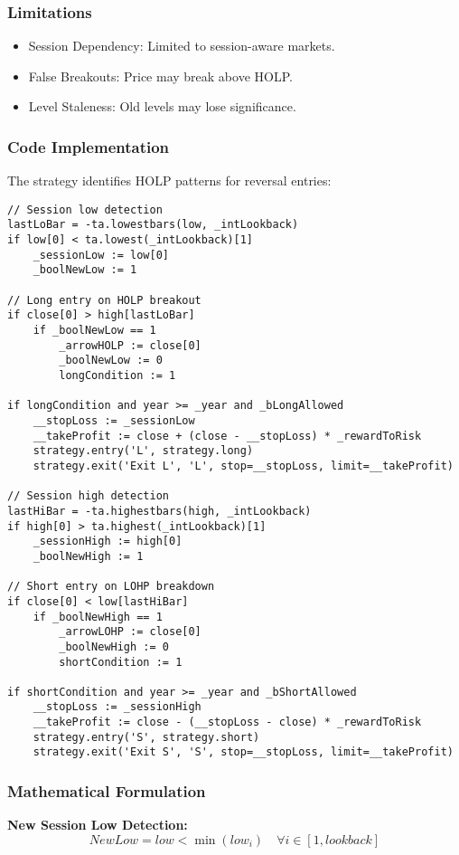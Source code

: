 \documentclass[12pt]{article}
\begin{document}
\subsubsection{Limitations}
\begin{itemize}
\item Session Dependency: Limited to session-aware markets.
\item False Breakouts: Price may break above HOLP.
\item Level Staleness: Old levels may lose significance.
\end{itemize}

\subsubsection{Code Implementation}
The strategy identifies HOLP patterns for reversal entries:

\begin{lstlisting}[language=Pine, caption=Pine Script Code for STRG-HOLP]
// Session low detection
lastLoBar = -ta.lowestbars(low, _intLookback)
if low[0] < ta.lowest(_intLookback)[1]
    _sessionLow := low[0]
    _boolNewLow := 1

// Long entry on HOLP breakout
if close[0] > high[lastLoBar]
    if _boolNewLow == 1
        _arrowHOLP := close[0]
        _boolNewLow := 0
        longCondition := 1

if longCondition and year >= _year and _bLongAllowed
    __stopLoss := _sessionLow
    __takeProfit := close + (close - __stopLoss) * _rewardToRisk
    strategy.entry('L', strategy.long)
    strategy.exit('Exit L', 'L', stop=__stopLoss, limit=__takeProfit)

// Session high detection
lastHiBar = -ta.highestbars(high, _intLookback)
if high[0] > ta.highest(_intLookback)[1]
    _sessionHigh := high[0]
    _boolNewHigh := 1

// Short entry on LOHP breakdown
if close[0] < low[lastHiBar]
    if _boolNewHigh == 1
        _arrowLOHP := close[0]
        _boolNewHigh := 0
        shortCondition := 1

if shortCondition and year >= _year and _bShortAllowed
    __stopLoss := _sessionHigh
    __takeProfit := close - (__stopLoss - close) * _rewardToRisk
    strategy.entry('S', strategy.short)
    strategy.exit('Exit S', 'S', stop=__stopLoss, limit=__takeProfit)
\end{lstlisting}

\subsubsection{Mathematical Formulation}
\textbf{New Session Low Detection:}
\[
NewLow = low < \min(low_{i}) \quad \forall i \in [1, lookback]
\]
\end{document}
